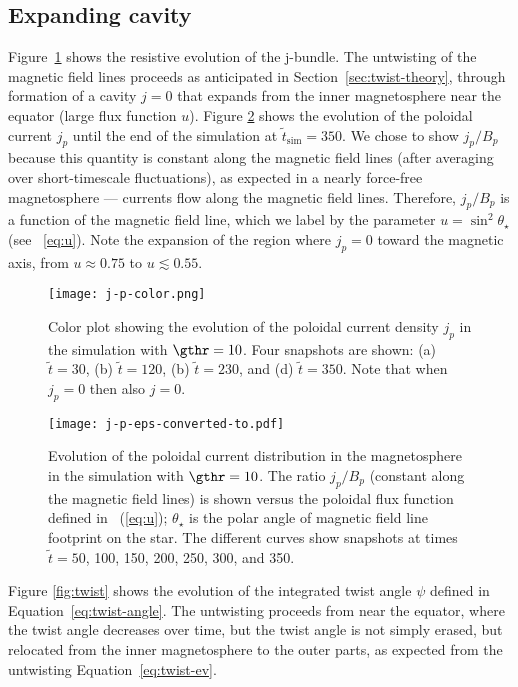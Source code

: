 \subsection{Expanding cavity}
\label{sec:untwisting}

Figure~\ref{fig:current} shows the resistive evolution of the j-bundle.
The untwisting of the magnetic field lines proceeds as anticipated
in
Section~\ref{sec:twist-theory}, through formation of a cavity $j=0$ that expands
from the inner magnetosphere near the equator (large flux function $u$).
Figure \ref{fig:jp} shows the evolution of the poloidal current $j_p$ until
the end of the simulation at $\tilde{t}_\mathrm{sim}=350$.
We chose to show $j_p/B_p$ because this quantity is constant along the magnetic
field lines (after averaging over short-timescale fluctuations), as expected in
a nearly force-free magnetosphere --- currents flow along the magnetic field lines.
Therefore, $j_p/B_p$ is a function of the magnetic field line, which we label
by the parameter $u=\sin^2\theta_\star$ (see \Eq~\ref{eq:u}).
Note the expansion of the region where $j_p = 0$ toward the magnetic axis,
from $u\approx 0.75$ to $u\lesssim 0.55$.

\begin{figure*}[t]
  \centering
  \texttt{[image: j-p-color.png]}
  \caption{Color plot showing the evolution of the poloidal current density $j_p$
  in the simulation with $\gthr=10$. Four snapshots are shown: (a) $\tilde{t}=30$,
  (b) $\tilde{t}=120$,  (b) $\tilde{t}=230$, and (d) $\tilde{t}=350$.
  Note that when $j_p=0$ then also $j=0$.}
  \label{fig:current}
\end{figure*}


\begin{figure}[t]
  \centering
  \texttt{[image: j-p-eps-converted-to.pdf]}
  \caption{Evolution of the poloidal current distribution in the magnetosphere
  in the simulation with $\gthr=10$.
  The ratio $j_p/B_p$ (constant along the magnetic field lines) is shown versus
  the poloidal flux function defined in \Eq~(\ref{eq:u}); $\theta_\star$ is the polar
  angle of magnetic field line footprint on the star. The different curves show snapshots
  at times $\tilde{t}=50$, 100, 150, 200, 250, 300, and 350.}
  \label{fig:jp}
\end{figure}

Figure \ref{fig:twist} shows the evolution of the integrated twist angle $\psi$
defined in Equation~\eqref{eq:twist-angle}. The untwisting proceeds from near
the equator, where the twist angle decreases over time, but the twist angle is
not simply erased, but relocated from the inner magnetosphere to the outer
parts, as expected from the untwisting Equation~\eqref{eq:twist-ev}.

